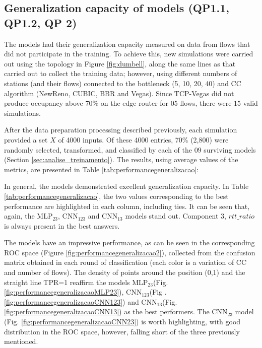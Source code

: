 \documentclass[a4paper,fleqn]{cas-sc}
\begin{document}
\subsection{Generalization capacity of models (QP1.1, QP1.2, QP 2)}
The models had their generalization capacity measured on data from flows that did not participate in the training. \text To achieve this, new simulations were carried out using the topology in Figure \ref{fig:dumbell}, along the same lines as that carried out to collect the training data; however, using different numbers of stations (and their flows) connected to the bottleneck (5, 10, 20, 40) and  CC algorithm (NewReno, CUBIC, BBR and Vegas). Since TCP-Vegas did not produce occupancy above $70\%$ on the edge router for 05 flows, there were $15$ valid simulations.


After the data preparation processing described previously, each simulation provided a set $X$ of 4000 inputs. Of these 4000 entries, 70\% (2,800) were randomly selected, transformed, and classified by each of the $09$ surviving models (Section \ref{sec:analise_treinamento}). The results, using average values of the metrics, are presented in Table \ref{tab:performancegeneralizacao}:

In general, the models demonstrated excellent generalization capacity. In Table \ref{tab:performancegeneralizacao}, the two values corresponding to the best performance are highlighted in each column, including ties. It can be seen that, again, the MLP$_{23}$, CNN$_{123}$ and CNN$_{13}$ models stand out. Component 3, $rtt\_ratio$ is always present in the best answers.

The models have an impressive performance, as can be seen in the corresponding ROC space (Figure \ref{fig:performancegeneralizacao2}), collected from the confusion matrix obtained in each round of classification (each color is a variation of CC and number of flows). The density of points around the position (0,1) and the straight line TPR=1 reaffirm the models MLP$_{23}$(Fig.\ref{fig:performancegeneralizacaoMLP23}), CNN$_{123}$(Fig . \ref{fig:performancegeneralizacaoCNN123}) and CNN$_{13}$(Fig. \ref{fig:performancegeneralizacaoCNN13}) as the best performers. The CNN$_{23}$ model (Fig. \ref{fig:performancegeneralizacaoCNN23}) is worth highlighting, with good distribution in the ROC space, however, falling short of the three previously mentioned.
\end{document}
